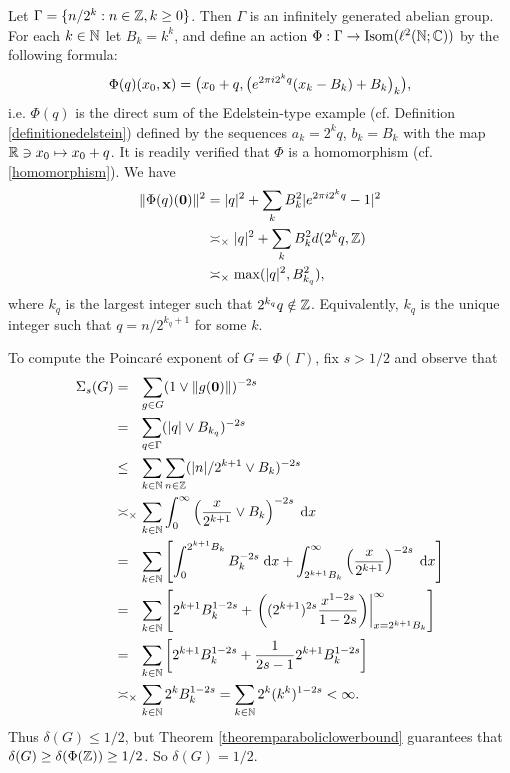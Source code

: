 \begin{example}
\label{exampleQparabolic}
Let $\Gamma = \{n/2^k : n\in\Z, k\geq 0\}$. Then $\Gamma$ is an infinitely generated abelian group. For each $k\in\N$ let $B_k = k^k$, and define an action $\Phi:\Gamma\to\Isom(\ell^2(\N;\C))$ by the following formula:
\[
\Phi(q)(x_0,\mathbf x) = \big(x_0 + q, \big(e^{2\pi i 2^k q}(x_k - B_k) + B_k\big)_k\big),
\]
i.e. $\Phi(q)$ is the direct sum of the Edelstein-type example (cf. Definition \ref{definitionedelstein}) defined by the sequences $a_k = 2^k q$, $b_k = B_k$ with the map $\R\ni x_0\mapsto x_0 + q$. It is readily verified that $\Phi$ is a homomorphism (cf. \eqref{homomorphism}). We have
\begin{align*}
\|\Phi(q)(\0)\|^2 &= |q|^2 + \sum_k B_k^2 |e^{2\pi i 2^k q} - 1|^2\\
&\asymp_\times |q|^2 + \sum_k B_k^2 \dist(2^k q,\Z)\\
&\asymp_\times \max(|q|^2, B_{k_q}^2),
\end{align*}
where $k_q$ is the largest integer such that $2^{k_q} q\notin\Z$. Equivalently, $k_q$ is the unique integer such that $q = n/2^{k_q + 1}$ for some $k$.

To compute the Poincar\'e exponent of $G = \Phi(\Gamma)$, fix $s > 1/2$ and observe that
\begin{align*}
\Sigma_s(G) &=_\pt \sum_{g\in G} (1\vee \|g(\0)\|)^{-2s}\\
&=_\pt \sum_{q\in \Gamma} (|q|\vee B_{k_q})^{-2s}\\
&\leq_\pt \sum_{k\in\N} \sum_{n\in\Z} (|n|/2^{k + 1} \vee B_k)^{-2s}\\
&\asymp_\times \sum_{k\in\N} \int_0^\infty \left(\frac{x}{2^{k + 1}} \vee B_k\right)^{-2s} \;\dee x\\
&=_\pt \sum_{k\in\N} \left[\int_0^{2^{k + 1} B_k} B_k^{-2s} \;\dee x + \int_{2^{k + 1} B_k}^\infty \left(\frac{x}{2^{k + 1}}\right)^{-2s} \;\dee x\right]\\
&=_\pt \sum_{k\in\N} \left[2^{k + 1} B_k^{1 - 2s} + \left.\left((2^{k + 1})^{2s}\frac{x^{1 - 2s}}{1 - 2s}\right)\right\vert_{x = 2^{k + 1} B_k}^\infty\right]\\
&=_\pt \sum_{k\in\N} \left[2^{k + 1} B_k^{1 - 2s} + \frac{1}{2s - 1} 2^{k + 1} B_k^{1 - 2s}\right]\\
&\asymp_\times \sum_{k\in\N} 2^k B_k^{1 - 2s}
= \sum_{k\in\N} 2^k (k^k)^{1 - 2s} < \infty.
\end{align*}
Thus $\delta(G) \leq 1/2$, but Theorem \ref{theoremparaboliclowerbound} guarantees that $\delta(G) \geq \delta(\Phi(\Z)) \geq 1/2$. So $\delta(G) = 1/2$.
\end{example}